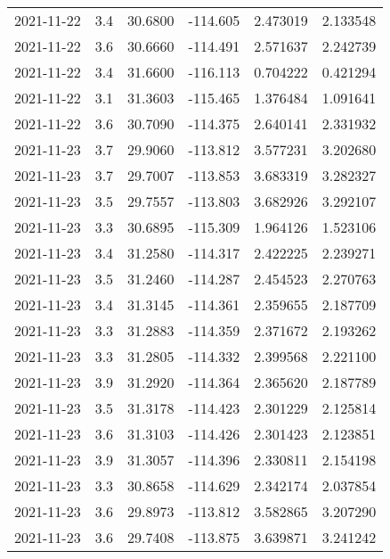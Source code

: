 \begin{tabular}{lrrrrr}
2021-11-22 &       3.4 &  30.6800 &  -114.605 &         2.473019 &         2.133548 \\
2021-11-22 &       3.6 &  30.6660 &  -114.491 &         2.571637 &         2.242739 \\
2021-11-22 &       3.4 &  31.6600 &  -116.113 &         0.704222 &         0.421294 \\
2021-11-22 &       3.1 &  31.3603 &  -115.465 &         1.376484 &         1.091641 \\
2021-11-22 &       3.6 &  30.7090 &  -114.375 &         2.640141 &         2.331932 \\
2021-11-23 &       3.7 &  29.9060 &  -113.812 &         3.577231 &         3.202680 \\
2021-11-23 &       3.7 &  29.7007 &  -113.853 &         3.683319 &         3.282327 \\
2021-11-23 &       3.5 &  29.7557 &  -113.803 &         3.682926 &         3.292107 \\
2021-11-23 &       3.3 &  30.6895 &  -115.309 &         1.964126 &         1.523106 \\
2021-11-23 &       3.4 &  31.2580 &  -114.317 &         2.422225 &         2.239271 \\
2021-11-23 &       3.5 &  31.2460 &  -114.287 &         2.454523 &         2.270763 \\
2021-11-23 &       3.4 &  31.3145 &  -114.361 &         2.359655 &         2.187709 \\
2021-11-23 &       3.3 &  31.2883 &  -114.359 &         2.371672 &         2.193262 \\
2021-11-23 &       3.3 &  31.2805 &  -114.332 &         2.399568 &         2.221100 \\
2021-11-23 &       3.9 &  31.2920 &  -114.364 &         2.365620 &         2.187789 \\
2021-11-23 &       3.5 &  31.3178 &  -114.423 &         2.301229 &         2.125814 \\
2021-11-23 &       3.6 &  31.3103 &  -114.426 &         2.301423 &         2.123851 \\
2021-11-23 &       3.9 &  31.3057 &  -114.396 &         2.330811 &         2.154198 \\
2021-11-23 &       3.3 &  30.8658 &  -114.629 &         2.342174 &         2.037854 \\
2021-11-23 &       3.6 &  29.8973 &  -113.812 &         3.582865 &         3.207290 \\
2021-11-23 &       3.6 &  29.7408 &  -113.875 &         3.639871 &         3.241242 \\

\end{tabular}
